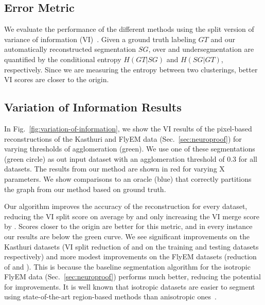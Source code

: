 
\subsection{Error Metric}
\label{sec:variation-of-information}

We evaluate the performance of the different methods using the split version of variance of information (VI)~\cite{meila2003comparing}.
Given a ground truth labeling $GT$ and our automatically reconstructed segmentation $SG$, over and undersegmentation are quantified by the conditional entropy $H(GT | SG)$ and $H(SG | GT)$, respectively. Since we are measuring the entropy between two clusterings, better VI scores are closer to the origin.

\subsection{Variation of Information Results}

In Fig.~\ref{fig:variation-of-information}, we show the VI results of the pixel-based reconstructions of the Kasthuri and FlyEM data (Sec.~\ref{sec:neuroproof}) for varying thresholds of agglomeration (green). We use one of these segmentations (green circle) as out input dataset with an agglomeration threshold of 0.3 for all datasets. The results from our method are shown in red for varying X  parameters. We show comparisons to an oracle (blue) that correctly partitions the graph from our method based on ground truth.

Our algorithm improves the accuracy of the reconstruction for every dataset, reducing the VI split score on average by  and only increasing the VI merge score by .
Scores closer to the origin are better for this metric, and in every instance our results are below the green curve.
We see significant improvements on the Kasthuri datasets (VI split reduction of  and  on the training and testing datasets respectively) and more modest improvements on the FlyEM datasets (reduction of  and ). This is because the baseline segmentation algorithm for the isotropic FlyEM data (Sec.~\ref{sec:neuroproof}) performs much better, reducing the potential for improvements. It is well known that isotropic datasets are easier to segment using state-of-the-art region-based methods than anisotropic ones~\cite{plaza2014annotating}.

